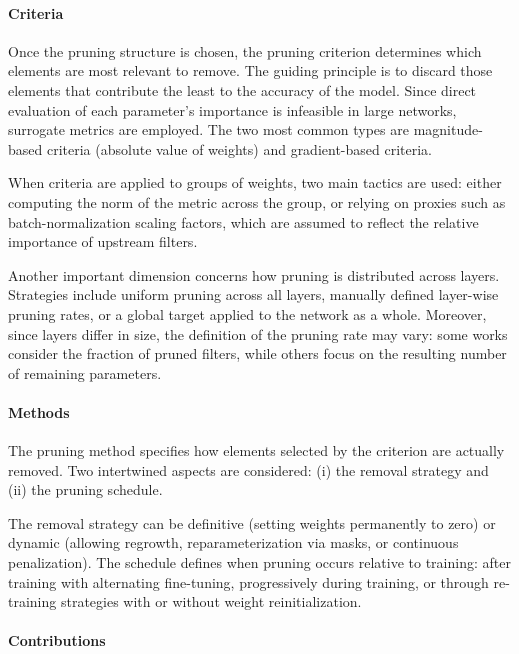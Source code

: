 \documentclass[11pt]{report}
\begin{document}
\paragraph{Criteria}

Once the pruning structure is chosen, the pruning criterion determines which elements are most relevant to remove. The guiding principle is to discard those elements that contribute the least to the accuracy of the model. Since direct evaluation of each parameter's importance is infeasible in large networks, surrogate metrics are employed. The two most common types are magnitude-based criteria (absolute value of weights) and gradient-based criteria.

When criteria are applied to groups of weights, two main tactics are used: either computing the norm of the metric across the group, or relying on proxies such as batch-normalization scaling factors, which are assumed to reflect the relative importance of upstream filters.

Another important dimension concerns how pruning is distributed across layers. Strategies include uniform pruning across all layers, manually defined layer-wise pruning rates, or a global target applied to the network as a whole. Moreover, since layers differ in size, the definition of the pruning rate may vary: some works consider the fraction of pruned filters, while others focus on the resulting number of remaining parameters.

\paragraph{Methods}

The pruning method specifies how elements selected by the criterion are actually removed. Two intertwined aspects are considered: (i) the removal strategy and (ii) the pruning schedule.

The removal strategy can be definitive (setting weights permanently to zero) or dynamic (allowing regrowth, reparameterization via masks, or continuous penalization).
The schedule defines when pruning occurs relative to training: after training with alternating fine-tuning, progressively during training, or through re-training strategies with or without weight reinitialization.

\paragraph{Contributions}
\end{document}
